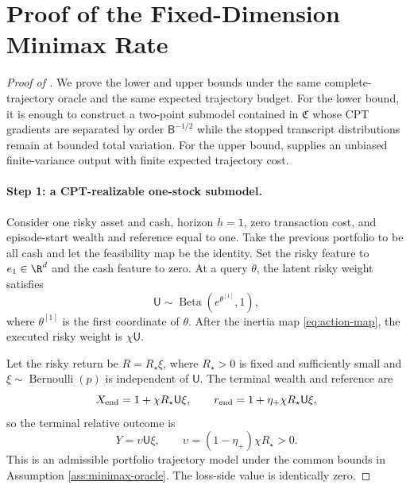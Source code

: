 \section{Proof of the Fixed-Dimension Minimax Rate}\label{app:minimax}

\begin{proof}[Proof of ]
We prove the lower and upper bounds under the same complete-trajectory oracle and the same expected trajectory budget.  For the lower bound, it is enough to construct a two-point submodel contained in $\mathfrak C$ whose CPT gradients are separated by order $\mathsf B^{-1/2}$ while the stopped transcript distributions remain at bounded total variation.  For the upper bound,  supplies an unbiased finite-variance output with finite expected trajectory cost.

\paragraph{Step 1: a CPT-realizable one-stock submodel.}
Consider one risky asset and cash, horizon $h=1$, zero transaction cost, and episode-start wealth and reference equal to one.  Take the previous portfolio to be all cash and let the feasibility map be the identity.  Set the risky feature to $e_1\in\R^d$ and the cash feature to zero.  At a query $\theta$, the latent risky weight satisfies
\[
 \mathsf U\sim\operatorname{Beta}(e^{\theta^{[1]}},1),
\]
where $\theta^{[1]}$ is the first coordinate of $\theta$.  After the inertia map \eqref{eq:action-map}, the executed risky weight is $\chi\mathsf U$.

Let the risky return be $R=R_\star\xi$, where $R_\star>0$ is fixed and sufficiently small and
$\xi\sim\operatorname{Bernoulli}(p)$ is independent of $\mathsf U$.  The terminal wealth and reference are
\[
 X_{\rm end}=1+\chi R_\star\mathsf U\xi,
 \qquad
 r_{\rm end}=1+\eta_+\chi R_\star\mathsf U\xi,
\]
so the terminal relative outcome is
\begin{equation}\label{eq:minimax-relative-outcome}
 Y=\upsilon\mathsf U\xi,
 \qquad
 \upsilon=(1-\eta_+)\chi R_\star>0.
\end{equation}
This is an admissible portfolio trajectory model under the common bounds in Assumption \ref{ass:minimax-oracle}.  The loss-side value is identically zero.


\end{proof}
